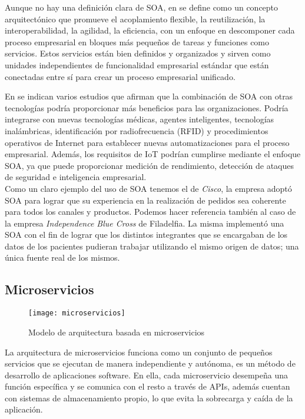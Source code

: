 Aunque no hay una definición clara de SOA, en \cite{soa} se define como un concepto arquitectónico que promueve el acoplamiento flexible, la reutilización, la interoperabilidad, la agilidad, la eficiencia, con un enfoque en descomponer cada proceso empresarial en bloques más pequeños de tareas y funciones como servicios. Estos servicios están bien definidos y organizados y sirven como unidades independientes de funcionalidad empresarial estándar que están conectadas entre sí para crear un proceso empresarial unificado.

En \cite{soa} se indican varios estudios que afirman que la combinación de SOA con otras tecnologías podría proporcionar más beneficios para las organizaciones. Podría integrarse con nuevas tecnologías médicas, agentes inteligentes, tecnologías inalámbricas, identificación por radiofrecuencia (RFID) y procedimientos operativos de Internet para establecer nuevas automatizaciones para el proceso empresarial. Además, los requisitos de IoT podrían cumplirse mediante el enfoque SOA, ya que puede proporcionar medición de rendimiento, detección de ataques de seguridad e inteligencia empresarial.\\

Como un claro ejemplo del uso de SOA tenemos el de \textit{Cisco}, la empresa adoptó SOA para lograr que su experiencia en la realización de pedidos sea coherente para todos los canales y productos. Podemos hacer referencia también al caso de la empresa \textit{Independence Blue Cross} de Filadelfia. La misma implementó una SOA con el fin de lograr que los distintos integrantes que se encargaban de los datos de los pacientes pudieran trabajar utilizando el mismo origen de datos; una única fuente real de los mismos.

\subsection{Microservicios}
\begin{figure}[h!]
	\centering
	\texttt{[image: microservicios]}
	\caption{Modelo de arquitectura basada en microservicios}
	\label{fig:microservicios}
\end{figure}

La arquitectura de microservicios funciona como un conjunto de pequeños servicios que se ejecutan de manera independiente y autónoma, es un método de desarrollo de aplicaciones software. En ella, cada microservicio desempeña una función específica y se comunica con el resto a través de APIs, además cuentan con sistemas de almacenamiento propio, lo que evita la sobrecarga y caída de la aplicación.

